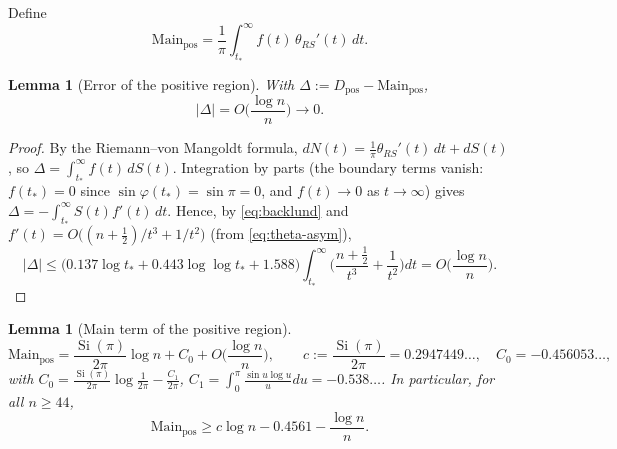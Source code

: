 \documentclass[11pt]{article}
\newtheorem{lemma}[theorem]{Lemma}
\newcommand{\Si}{\operatorname{Si}}
\begin{document}
Define
\begin{equation*}
\mathrm{Main}_{\mathrm{pos}}=\frac1\pi\int_{t_*}^{\infty}f(t)\,\theta_{RS}'(t)\,dt.
\end{equation*}

\begin{lemma}[Error of the positive region]
\label{lem:delta}
With $\Delta:=D_{\mathrm{pos}}-\mathrm{Main}_{\mathrm{pos}}$,
\[
|\Delta|=O\!\Big(\frac{\log n}{n}\Big)\to0.
\]
\end{lemma}

\begin{proof}
By the Riemann--von Mangoldt formula, $dN(t)=\frac1\pi\theta_{RS}'(t)\,dt+dS(t)$, so
$\Delta=\int_{t_*}^{\infty}f(t)\,dS(t)$. Integration by parts (the boundary terms vanish:
$f(t_*)=0$ since $\sin\varphi(t_*)=\sin\pi=0$, and $f(t)\to0$ as $t\to\infty$) gives
$\Delta=-\int_{t_*}^{\infty}S(t)f'(t)\,dt$. Hence, by \eqref{eq:backlund} and
$f'(t)=O\big((n+\tfrac12)/t^3+1/t^2\big)$ (from \eqref{eq:theta-asym}),
\[
|\Delta|\le\big(0.137\log t_*+0.443\log\log t_*+1.588\big)\int_{t_*}^{\infty}\Big(\frac{n+\tfrac12}{t^3}+\frac1{t^2}\Big)dt
=O\!\Big(\frac{\log n}{n}\Big).
\]
\end{proof}

\begin{lemma}[Main term of the positive region]
\label{lem:main}
\[
\mathrm{Main}_{\mathrm{pos}}=\frac{\Si(\pi)}{2\pi}\log n+C_0+O\Big(\frac{\log n}{n}\Big),
\qquad
c:=\frac{\Si(\pi)}{2\pi}=0.2947449\ldots,\quad
C_0=-0.456053\ldots,
\]
with $C_0=\frac{\Si(\pi)}{2\pi}\log\frac1{2\pi}-\frac{C_1}{2\pi}$, $C_1=\int_0^\pi\frac{\sin u\log u}{u}du=-0.538\ldots$.
In particular, for all $n\ge44$,
\begin{equation}\label{eq:main-lb}
\mathrm{Main}_{\mathrm{pos}}\ge c\log n-0.4561-\frac{\log n}{n}.
\end{equation}
\end{lemma}
\end{document}
